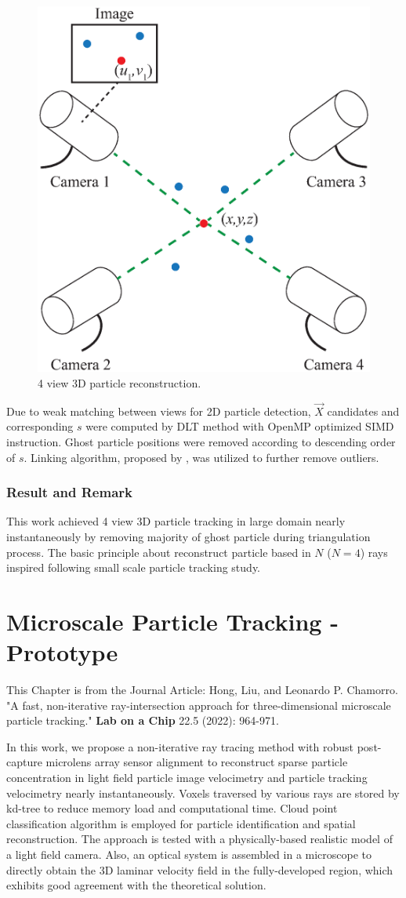 \documentclass[draftthesis,fullpage]{uiucthesis}
\begin{document}
\begin{figure}[h]
       \centerline{\includegraphics[width=0.6\linewidth]{FIG/DLT.eps}}
       \caption{4 view 3D particle reconstruction.}
       \label{fig:DLT}
\end{figure}
Due to weak matching between views for 2D particle detection, $\overrightarrow{X}$ candidates and corresponding $s$ were computed by DLT method with OpenMP optimized SIMD instruction. Ghost particle positions were removed according to descending order of $s$. Linking algorithm, proposed by \citet{crocker1996methods}, was utilized to further remove outliers.

\subsection*{Result and Remark}
This work achieved 4 view 3D particle tracking in large domain nearly instantaneously by removing majority of ghost particle during triangulation process. The basic principle about reconstruct particle based in $N$ ($N = 4$) rays inspired following small scale particle tracking study.


\chapter{Microscale Particle Tracking - Prototype}\label{chapter:MPT}
This Chapter is from the Journal Article:
Hong, Liu, and Leonardo P. Chamorro. "A fast, non-iterative ray-intersection approach for three-dimensional microscale particle tracking." \textbf{Lab on a Chip} 22.5 (2022): 964-971.

In this work, we propose a non-iterative ray tracing method with robust post-capture microlens array sensor alignment to reconstruct sparse particle concentration in light field particle image velocimetry and particle tracking velocimetry nearly instantaneously. Voxels traversed by various rays are stored by kd-tree to reduce memory load and computational time. Cloud point classification algorithm is employed for particle identification and spatial reconstruction. The approach is tested with a physically-based realistic model of a light field camera. Also, an optical system is assembled in a microscope to directly obtain the 3D laminar velocity field in the fully-developed region, which exhibits good agreement with the theoretical solution.
\end{document}
